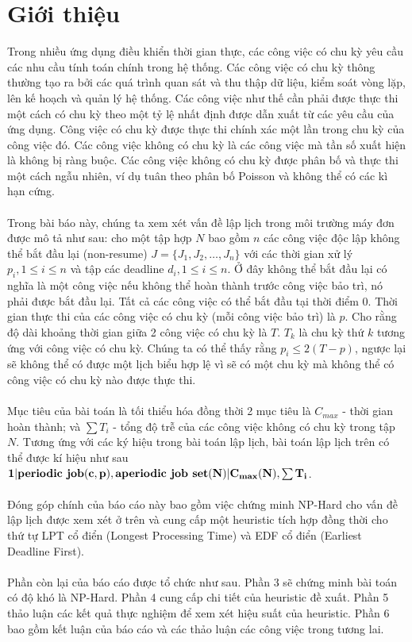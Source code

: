 \documentclass[a4paper,12pt]{article}
\begin{document}
\section{Giới thiệu}
Trong nhiều ứng dụng điều khiển thời gian thực, các công việc có chu kỳ yêu cầu các nhu cầu tính toán chính trong hệ thống. Các công việc có chu kỳ thông thường tạo ra bởi các quá trình quan sát và thu thập dữ liệu, kiểm soát vòng lặp, lên kế hoạch và quản lý hệ thống. Các công việc như thế cần phải được thực thi một cách có chu kỳ theo một tỷ lệ nhất định được dẫn xuất từ các yêu cầu của ứng dụng. Công việc có chu kỳ được thực thi chính xác một lần trong chu kỳ của công việc đó. Các công việc không có chu kỳ là các công việc mà tần số xuất hiện là không bị ràng buộc. Các công việc không có chu kỳ được phân bố và thực thi một cách ngẫu nhiên, ví dụ tuân theo phân bố Poisson và không thể có các kì hạn cứng.\\\\
Trong bài báo này, chúng ta xem xét vấn đề lập lịch trong môi trường máy đơn được mô tả như sau: cho một tập hợp $N$ bao gồm $n$ các công việc độc lập không thể bắt đầu lại (non-resume) $J = \{J_1, J_2,\ldots,J_n\}$ với các thời gian xử lý $p_i, 1 \le i \le n$ và tập các deadline $d_i, 1 \le i \le n$. Ở đây không thể bắt đầu lại có nghĩa là một công việc nếu không thể hoàn thành trước công việc bảo trì, nó phải được bắt đầu lại. Tất cả các công việc có thể bắt đầu tại thời điểm $0$. Thời gian thực thi của các công việc có chu kỳ (mỗi công việc bảo trì) là $p$. Cho rằng độ dài khoảng thời gian giữa 2 công việc có chu kỳ là $T$. $T_k$ là chu kỳ thứ $k$ tương ứng với công việc có chu kỳ. Chúng ta có thể thấy rằng $p_i \le 2(T-p)$, ngược lại sẽ không thể có được một lịch biểu hợp lệ vì sẽ có một chu kỳ mà không thể có công việc có chu kỳ nào được thực thi.\\\\
Mục tiêu của bài toán là tối thiểu hóa đồng thời 2 mục tiêu là $C_{max}$ -  thời gian hoàn thành; và $\sum T_i$ -  tổng độ trễ của các công việc không có chu kỳ trong tập $N$. Tương ứng với các ký hiệu trong bài toán lập lịch, bài toán lập lịch trên có thể được kí hiệu như sau $\mathbf{1 | \mbox{\textbf{periodic job}} (c,p), \mbox{\textbf{aperiodic job set}} (N) |  C_{max}(N), \sum T_i}$.\\\\
Đóng góp chính của báo cáo này bao gồm việc chứng minh NP-Hard cho vấn đề lập lịch được xem xét ở trên và cung cấp một heuristic tích hợp đồng thời cho thứ tự LPT cổ điển (Longest Processing Time) và EDF cổ điển (Earliest Deadline First).\\\\
Phần còn lại của báo cáo được tổ chức như sau. Phần 3 sẽ chứng minh bài toán có độ khó là NP-Hard. Phần 4 cung cấp chi tiết của heuristic đề xuất. Phần 5 thảo luận các kết quả thực nghiệm để xem xét hiệu suất của heuristic. Phần 6 bao gồm kết luận của báo cáo và các thảo luận các công việc trong tương lai.
\end{document}
